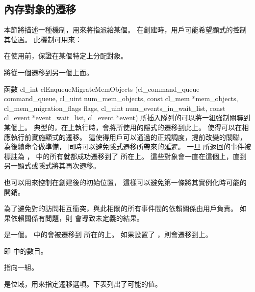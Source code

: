 \subsection{內存對象的遷移}

本節將描述一種機制，用來將指派給某個。
在創建時，用戶可能希望顯式的控制其位置。
此機制可用來：
\startigBase
\item 在使用前，保證在某個特定上分配對象。

\item 將從一個遷移到另一個上面。
\stopigBase

函數
\startclc
cl_int clEnqueueMigrateMemObjects (cl_command_queue command_queue,
			cl_uint num_mem_objects,
			const cl_mem *mem_objects,
			cl_mem_migration_flags flags,
			cl_uint num_events_in_wait_list,
			const cl_event *event_wait_list,
			cl_event *event)
\stopclc
所插入隊列的可以將一組強制關聯到某個上。
典型的，在上執行時，會將所使用的隱式的遷移到此上。
 使得可以在相應執行前實施顯式的遷移。
這使得用戶可以通過的正規調度，提前改變的關聯，為後續命令做準備，
同時可以避免隱式遷移所帶來的延遲。
一旦  所返回的事件被標註為 ，
  中的所有就都成功遷移到了  所在上。
這些對象會一直在這個上，直到另一顯式或隱式將其再次遷移。

 也可以用來控制在創建後的初始位置，
這樣可以避免第一條將其實例化時可能的開銷。

為了避免對的訪問相互衝突，與此相關的所有事件間的依賴關係由用戶負責。
如果依賴關係有問題，則  會導致未定義的結果。

 是一個。
  中的會被遷移到  所在的上。
如果設置了 ，則會遷移到上。

 即  中的數目。

 指向一組。

 是位域，用來指定遷移選項。下表列出了可能的值。

{}

